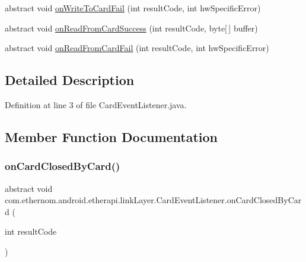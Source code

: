 \begin{DoxyCompactItemize}
\item 
abstract void \mbox{\hyperlink{classcom_1_1ethernom_1_1android_1_1etherapi_1_1link_layer_1_1_card_event_listener_ad2d31c5d9007c510b380e5195e5411da}{on\+Write\+To\+Card\+Fail}} (int result\+Code, int hw\+Specific\+Error)
\item 
abstract void \mbox{\hyperlink{classcom_1_1ethernom_1_1android_1_1etherapi_1_1link_layer_1_1_card_event_listener_af22ac0f453fa0f726a6490f69b298dd6}{on\+Read\+From\+Card\+Success}} (int result\+Code, byte\mbox{[}$\,$\mbox{]} buffer)
\item 
abstract void \mbox{\hyperlink{classcom_1_1ethernom_1_1android_1_1etherapi_1_1link_layer_1_1_card_event_listener_afcce05e6e80e339404ad768a8af4bc9c}{on\+Read\+From\+Card\+Fail}} (int result\+Code, int hw\+Specific\+Error)
\end{DoxyCompactItemize}


\subsection{Detailed Description}


Definition at line 3 of file Card\+Event\+Listener.\+java.



\subsection{Member Function Documentation}
\mbox{\label{classcom_1_1ethernom_1_1android_1_1etherapi_1_1link_layer_1_1_card_event_listener_aba636a8cdbf15d8440b26c66b653b611}} 
\subsubsection{\texorpdfstring{on\+Card\+Closed\+By\+Card()}{onCardClosedByCard()}}
{\footnotesize\ttfamily abstract void com.\+ethernom.\+android.\+etherapi.\+link\+Layer.\+Card\+Event\+Listener.\+on\+Card\+Closed\+By\+Card (\begin{DoxyParamCaption}\item[{int}]{result\+Code }\end{DoxyParamCaption})\hspace{0.3cm}{\ttfamily [abstract]}}


